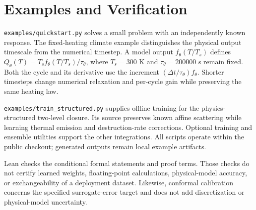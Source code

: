 \documentclass[11pt]{article}
\newcommand{\code}[1]{\texttt{#1}}
\begin{document}
\section{Examples and Verification}
\label{sec:results}
\code{examples/quickstart.py} solves a small problem with an independently
known response. The fixed-heating climate example distinguishes the
physical output timescale from the numerical timestep. A model output
$f_\theta(T/T_s)$ defines $Q_\theta(T)=T_s f_\theta(T/T_s)/\tau_\theta$,
where $T_s=300$ K and $\tau_\theta=200000$ s remain fixed.
Both the cycle and its derivative use the increment
$(\Delta t/\tau_\theta)f_\theta$. Shorter timesteps change numerical
relaxation and per-cycle gain while preserving the same heating law.

\code{examples/train\_structured.py} supplies offline training for the
physics-structured two-level closure. Its source preserves known affine
scattering while learning thermal emission and destruction-rate corrections.
Optional training and ensemble utilities support the other integrations.
All scripts operate within the public checkout; generated outputs remain
local example artifacts.

Lean checks the conditional formal statements and proof terms.
Those checks do not certify learned weights, floating-point calculations,
physical-model accuracy, or exchangeability of a deployment dataset.
Likewise, conformal calibration concerns the specified surrogate-error
target and does not add discretization or physical-model uncertainty.
\end{document}
